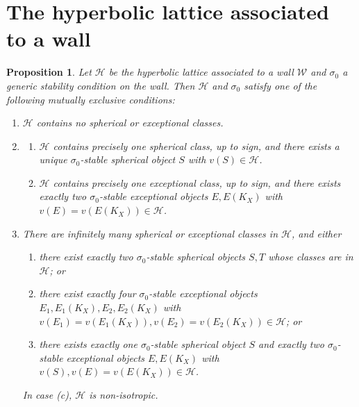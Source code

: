 \documentclass[leqno,11pt]{amsart}
\newtheorem{Prop}[Thm]{Proposition}
\theoremstyle{definition}
\def\HH{\ensuremath{\mathcal H}}
\def\WW{\ensuremath{\mathcal W}}
\begin{document}
\section{The hyperbolic lattice associated to a wall}
\begin{Prop}\label{Prop:lattice classification}Let $\HH$ be the hyperbolic lattice associated to a wall $\WW$ and $\sigma_0$ a generic stability condition on the wall.  Then $\HH$ and $\sigma_0$ satisfy one of the following mutually exclusive conditions:
\begin{enumerate}
\item\label{enum:nonegativeclasses} $\HH$ contains no spherical or exceptional classes.  
\item\label{enum:OneNegative} \begin{enumerate}
	\item\label{enum:OneSpherical} $\HH$ contains precisely one spherical class, up to sign, and there exists a unique $\sigma_0$-stable spherical object $S$ with $v(S)\in\HH$.
    \item\label{enum:OneExceptional} $\HH$ contains precisely one exceptional class, up to sign, and there exists exactly two $\sigma_0$-stable exceptional objects $E,E(K_X)$ with $v(E)=v(E(K_X))\in\HH$.
    \end{enumerate}
\item\label{enum:TwoNegative} There are infinitely many spherical or exceptional classes in $\HH$, and either 
\begin{enumerate}
\item\label{enum:TwoSpherical} there exist exactly two $\sigma_0$-stable spherical objects $S,T$ whose classes are in $\HH$; or
\item\label{enum:TwoExceptional} there exist exactly four $\sigma_0$-stable exceptional objects $E_1,E_1(K_X),E_2,E_2(K_X)$ with $v(E_1)=v(E_1(K_X)),v(E_2)=v(E_2(K_X))\in\HH$; or
\item\label{enum:OneExceptionalOneSpherical} there exists exactly one $\sigma_0$-stable spherical object $S$ and exactly two $\sigma_0$-stable exceptional objects $E,E(K_X)$ with $v(S),v(E)=v(E(K_X))\in\HH$.
\end{enumerate}
In case (c), $\HH$ is non-isotropic.
\end{enumerate}
\end{Prop}
\end{document}
